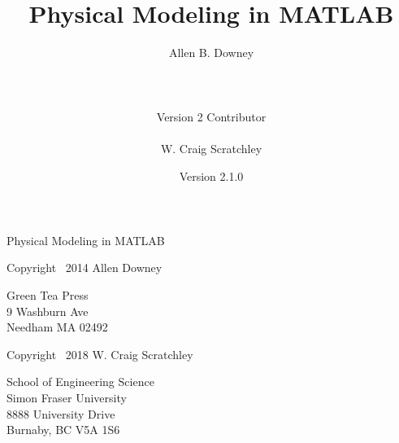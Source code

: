 \documentclass[
]{book}
\newcommand{\myreg}{\textsuperscript{{\tiny \textregistered}}}
\newcommand{\thetitle}{Physical Modeling in MATLAB\myreg}
\newcommand{\theversion}{2.1.0}
\begin{document}
\frontmatter

\title {\thetitle}
\author {Allen B. Downey\\
\\
\\
\\
Version 2 Contributor\\
\\
W. Craig Scratchley\\}
\date {Version \theversion}


\begin{latexonly}


    \maketitle
\restoregeometry


\vspace{2in}

\begin{center}
    {\Large \thetitle}
\end{center}

\vspace{21em}

Copyright \textcopyright \, 2014 Allen Downey

\vspace{0.5em}

\begin{flushleft}
Green Tea Press       \\
9 Washburn Ave \\
Needham MA 02492
\end{flushleft}

\vspace{0.5em}

Copyright \textcopyright \, 2018 W. Craig Scratchley

\vspace{0.5em}

\begin{flushleft}
School of Engineering Science\\
Simon Fraser University\\
8888 University Drive\\
Burnaby, BC V5A 1S6
\end{flushleft}


\end{latexonly}
\end{document}
